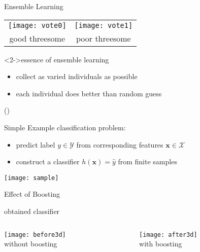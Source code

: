 \documentclass[fleqn,aspectratio=1610]{beamer}
\begin{document}
\begin{frame}[label={sec:orgca0193b}]{Ensemble Learning}
\begin{center}
\begin{tabular}{cc}
  \texttt{[image: vote0]}
  &\texttt{[image: vote1]}\\
  good threesome
  &\alert{poor threesome}
\end{tabular}
\end{center}
\begin{alertblock}<2->{essence of ensemble learning}
\begin{itemize}
\item collect as varied individuals as possible
\item each individual does better than random guess
\end{itemize}
(\cite{Freund1995,FreundSchapire1997})  
\end{alertblock}
\end{frame}

\begin{frame}[label={sec:orgc5740e9}]{Simple Example}
classification problem:
\begin{itemize}
\item predict label \(y\in\mathcal{Y}\) from corresponding
features \(\boldsymbol{x}\in\mathcal{X}\)
\item construct a classifier \(h(\boldsymbol{x})=\hat{y}\) from finite samples
\end{itemize}
\begin{center}
\texttt{[image: sample]}
\end{center}
\end{frame}

\begin{frame}[label={sec:orgf92c82d}]{Effect of Boosting}
\begin{center}
obtained classifier
\end{center}
\begin{columns}
\begin{column}{0.5\columnwidth}
\begin{center}
\texttt{[image: before3d]} \\[0pt]
without boosting
\end{center}
\end{column}
\begin{column}{0.5\columnwidth}
\begin{center}
\texttt{[image: after3d]} \\[0pt]
with boosting
\end{center}
\end{column}
\end{columns}
\end{frame}
\end{document}
